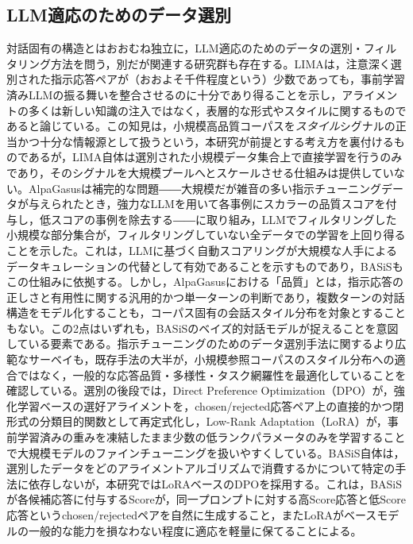 \documentclass[manuscript,review,anonymous]{acmart}
\begin{document}
\subsection{LLM適応のためのデータ選別}
対話固有の構造とはおおむね独立に，LLM適応のためのデータの選別・フィルタリング方法を問う，別だが関連する研究群も存在する。LIMAは，注意深く選別された指示応答ペアが（おおよそ千件程度という）少数であっても，事前学習済みLLMの振る舞いを整合させるのに十分であり得ることを示し，アライメントの多くは新しい知識の注入ではなく，表層的な形式やスタイルに関するものであると論じている\cite{zhou2023lima}。この知見は，小規模高品質コーパスを\emph{スタイル}シグナルの正当かつ十分な情報源として扱うという，本研究が前提とする考え方を裏付けるものであるが，LIMA自体は選別された小規模データ集合上で直接学習を行うのみであり，そのシグナルを大規模プールへとスケールさせる仕組みは提供していない。AlpaGasusは補完的な問題――大規模だが雑音の多い指示チューニングデータが与えられたとき，強力なLLMを用いて各事例にスカラーの品質スコアを付与し，低スコアの事例を除去する――に取り組み，LLMでフィルタリングした小規模な部分集合が，フィルタリングしていない全データでの学習を上回り得ることを示した\cite{chen2023alpagasus}。これは，LLMに基づく自動スコアリングが大規模な人手によるデータキュレーションの代替として有効であることを示すものであり，BASiSもこの仕組みに依拠する。しかし，AlpaGasusにおける「品質」とは，指示応答の正しさと有用性に関する汎用的かつ単一ターンの判断であり，複数ターンの対話構造をモデル化することも，コーパス固有の会話スタイル分布を対象とすることもない。この2点はいずれも，BASiSのベイズ的対話モデルが捉えることを意図している要素である。指示チューニングのためのデータ選別手法に関するより広範なサーベイも，既存手法の大半が，小規模参照コーパスのスタイル分布への適合ではなく，一般的な応答品質・多様性・タスク網羅性を最適化していることを確認している\cite{zhang2025datasurvey}。選別の後段では，Direct Preference Optimization（DPO）が，強化学習ベースの選好アライメントを，chosen/rejected応答ペア上の直接的かつ閉形式の分類目的関数として再定式化し\cite{rafailov2023dpo}，Low-Rank Adaptation（LoRA）が，事前学習済みの重みを凍結したまま少数の低ランクパラメータのみを学習することで大規模モデルのファインチューニングを扱いやすくしている\cite{hu2021lora}。BASiS自体は，選別したデータをどのアライメントアルゴリズムで消費するかについて特定の手法に依存しないが，本研究ではLoRAベースのDPOを採用する。これは，BASiSが各候補応答に付与するScoreが，同一プロンプトに対する高Score応答と低Score応答というchosen/rejectedペアを自然に生成すること，またLoRAがベースモデルの一般的な能力を損なわない程度に適応を軽量に保てることによる。
\end{document}
